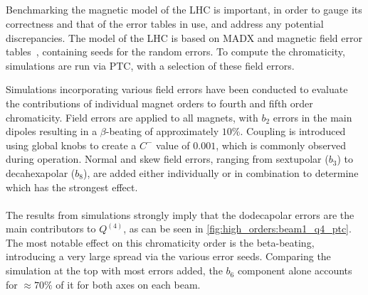 \FloatBarrier
\subsection{}
\label{sec:nl_chroma_model}

Benchmarking the magnetic model of the LHC is important, in order to gauge its correctness and that
of the error tables in use, and address any potential discrepancies. The model of the LHC is based on
MADX and magnetic field error tables~\cite{p_hagen_wise_2006}, containing seeds for the random
errors. To compute the chromaticity, simulations are run via PTC, with a selection of these field 
errors.

Simulations incorporating various field errors have been conducted to evaluate the contributions of
individual magnet orders to fourth and fifth order chromaticity. Field errors
are applied to all magnets, with $b_2$ errors in the main dipoles resulting in a $\beta$-beating of
approximately $10\%$. Coupling is introduced using global knobs to create a $C^-$ value of $0.001$,
which is commonly observed during operation. Normal and skew field errors, ranging from sextupolar
($b_3$) to decahexapolar ($b_8$), are added either individually or in combination to determine which
has the strongest effect.


\paragraph{}

The results from simulations strongly imply that the dodecapolar errors are the main contributors
to $Q^{(4)}$, as can be seen in \cref{fig:high_orders:beam1_q4_ptc}.
The most notable effect on this chromaticity order is the beta-beating, introducing a very large
spread via the various error seeds.
Comparing the simulation at the top with most errors added, the $b_6$ component alone accounts for
$\approx 70\%$ of it for both axes on each beam.

